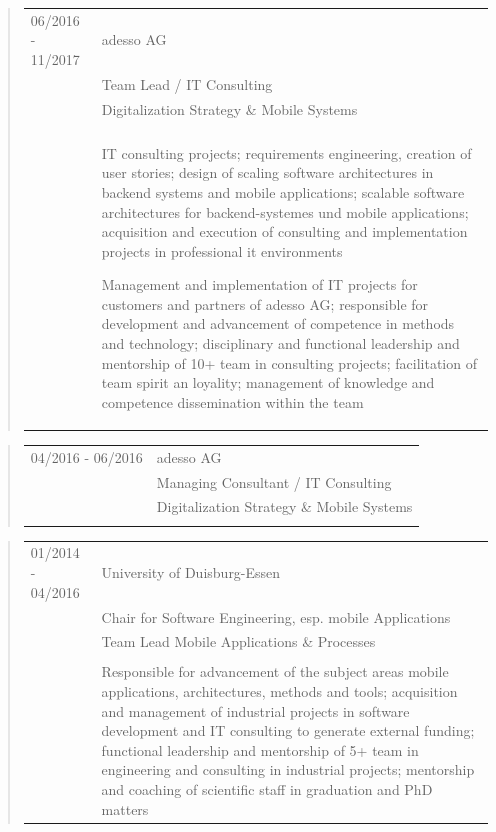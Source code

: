 	\begin{quote}
		\begin{tabular}{p{4cm}l}
			06/2016 - 11/2017&adesso AG\\
			&Team Lead / IT Consulting\\
			&Digitalization Strategy \& Mobile Systems\\\\
			&\begin{minipage}{10cm}
				IT consulting projects; requirements engineering, creation of user stories; design of scaling software architectures in backend systems and mobile applications;  scalable software architectures for backend-systemes und mobile applications; acquisition and execution of consulting and implementation projects in professional it environments\newline
				
				Management and implementation of IT projects for customers and partners of adesso AG; responsible for development and advancement of competence in methods and technology; disciplinary and functional leadership and mentorship of 10+ team in consulting projects; facilitation of team spirit an loyality; management of knowledge and competence dissemination within the team%
			\end{minipage}
		\end{tabular}
	\end{quote}
	\begin{quote}
		\begin{tabular}{p{4cm}l}
			04/2016 - 06/2016&adesso AG\\
			&Managing Consultant / IT Consulting \\
			&Digitalization Strategy \& Mobile Systems\\\\
		\end{tabular}
	\end{quote}
	\begin{quote}
		\begin{tabular}{p{4cm}l}
			01/2014 - 04/2016&University of Duisburg-Essen\\
			&Chair for Software Engineering, esp. mobile Applications\\
			&Team Lead Mobile Applications \& Processes\\\\
			&\begin{minipage}{10cm}
				Responsible for advancement of the subject areas mobile applications, architectures, methods and tools; acquisition and management of  industrial projects in software development and IT consulting to generate external funding; functional leadership and mentorship of 5+ team in engineering and consulting in industrial projects; mentorship and coaching of scientific staff in graduation and PhD matters
			\end{minipage}
		\end{tabular}
	\end{quote}

